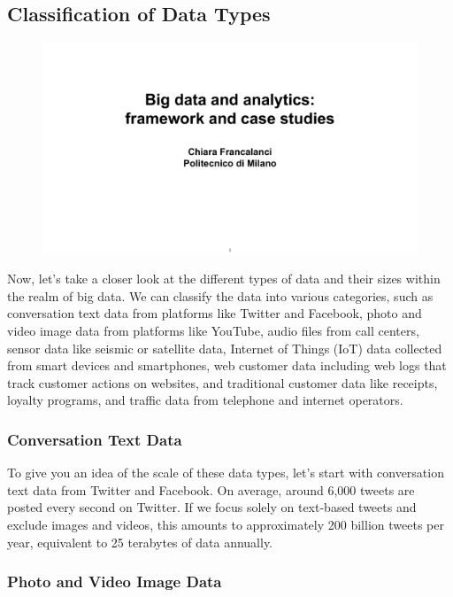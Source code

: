 \subsection{Classification of Data Types}

\begin{figure}[!h]
    \centering
    \includegraphics[page=30, trim = 1.5cm 1.7cm 2cm 4.5cm, clip, width=\textwidth]{images/06 - BIG_DATA.pdf}
\end{figure}

Now, let's take a closer look at the different types of data and their
sizes within the realm of big data. We can classify the data into
various categories, such as conversation text data from platforms like
Twitter and Facebook, photo and video image data from platforms like
YouTube, audio files from call centers, sensor data like seismic or
satellite data, Internet of Things (IoT) data collected from smart
devices and smartphones, web customer data including web logs that track
customer actions on websites, and traditional customer data like
receipts, loyalty programs, and traffic data from telephone and internet
operators.

\subsubsection{Conversation Text Data}

To give you an idea of the scale of these data types, let's start with
conversation text data from Twitter and Facebook. On average, around
6,000 tweets are posted every second on Twitter. If we focus solely on
text-based tweets and exclude images and videos, this amounts to
approximately 200 billion tweets per year, equivalent to 25 terabytes of
data annually.

\subsubsection{Photo and Video Image Data}

